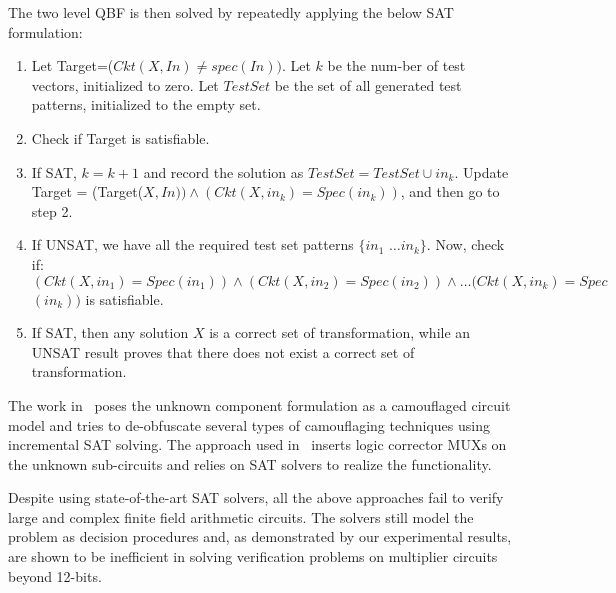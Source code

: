 The two level QBF is then solved by repeatedly applying the below SAT formulation:
  
\begin{enumerate}
	\item Let Target=($Ckt(X,In)\neq spec(In))$. Let $k$ be the num-ber of test vectors, initialized to zero. Let $TestSet$ be the set of all generated test patterns, initialized to the empty set.
	\item Check if Target is satisfiable.
	\item If SAT, $k=k+1$ and record the solution as $TestSet = TestSet \cup in_k$. Update Target = (Target($X,In))\land(Ckt(X,in_k)=Spec(in_k))$, and then go to step 2.
    \item If UNSAT, we have all the required test set patterns $\{in_1$ $\dots in_k\}$. Now, check if: $(Ckt(X,in_1) = Spec(in_1)) \land (Ckt(X,in_2) = Spec(in_2)) \land \dots (Ckt(X,in_k) = Spec$ $(in_k))$ is satisfiable.
    \item If SAT, then any solution $X$ is a correct set of transformation, while an UNSAT result proves that there does not exist a correct set of transformation.
\end{enumerate}

The work in~\cite{maciej:2017} poses the unknown component formulation
as a camouflaged circuit model and tries to de-obfuscate several types
of camouflaging techniques using incremental SAT solving. The approach
used in~\cite{andreas:2005} inserts logic corrector MUXs on the
unknown sub-circuits and relies on SAT solvers to realize the
functionality. 

Despite using state-of-the-art SAT solvers, all the above approaches
fail to verify large and complex finite field arithmetic circuits. The
solvers still model the problem as decision procedures and, as
demonstrated by our experimental results, are shown to be inefficient
in solving verification problems on multiplier circuits beyond
12-bits.  

